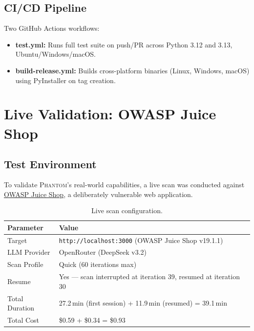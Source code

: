 \documentclass[12pt,a4paper,twoside]{report}
\makeatletter
\newcommand{\phantom@}{\textsc{Phantom}}
\makeatother
\begin{document}
\section{CI/CD Pipeline}

Two GitHub Actions workflows:
\begin{itemize}
    \item \textbf{test.yml:} Runs full test suite on push/PR across Python 3.12 and 3.13, Ubuntu/Windows/macOS.
    \item \textbf{build-release.yml:} Builds cross-platform binaries (Linux, Windows, macOS) using PyInstaller on tag creation.
\end{itemize}


\chapter{Live Validation: OWASP Juice Shop}
\label{ch:validation}

\section{Test Environment}

To validate \phantom@{}'s real-world capabilities, a live scan was conducted against \href{https://owasp.org/www-project-juice-shop/}{OWASP Juice Shop}, a deliberately vulnerable web application.

\begin{table}[H]
\centering
\caption{Live scan configuration.}
\label{tab:livescan}
\begin{tabularx}{\textwidth}{lX}
\toprule
\textbf{Parameter} & \textbf{Value} \\
\midrule
Target          & \texttt{http://localhost:3000} (OWASP Juice Shop v19.1.1) \\
LLM Provider    & OpenRouter (DeepSeek v3.2) \\
Scan Profile    & Quick (60 iterations max) \\
Resume          & Yes --- scan interrupted at iteration 39, resumed at iteration 30 \\
Total Duration  & 27.2\,min (first session) + 11.9\,min (resumed) = 39.1\,min \\
Total Cost      & \$0.59 + \$0.34 = \$0.93 \\
\bottomrule
\end{tabularx}
\end{table}
\end{document}
